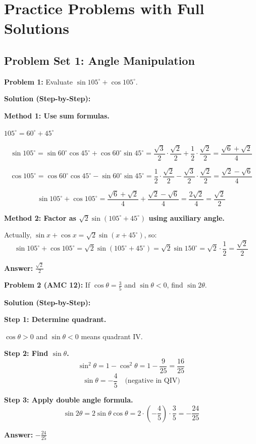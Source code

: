 \documentclass[12pt]{extarticle}
\begin{document}
\section{Practice Problems with Full Solutions}

\subsection{Problem Set 1: Angle Manipulation}

\begin{examplebox}
\textbf{Problem 1:} Evaluate $\sin 105^\circ + \cos 105^\circ$.

\textbf{Solution (Step-by-Step):}

\textbf{Method 1: Use sum formulas.}

$105^\circ = 60^\circ + 45^\circ$

\[
\sin 105^\circ = \sin 60^\circ \cos 45^\circ + \cos 60^\circ \sin 45^\circ = \frac{\sqrt{3}}{2} \cdot \frac{\sqrt{2}}{2} + \frac{1}{2} \cdot \frac{\sqrt{2}}{2} = \frac{\sqrt{6} + \sqrt{2}}{4}
\]

\[
\cos 105^\circ = \cos 60^\circ \cos 45^\circ - \sin 60^\circ \sin 45^\circ = \frac{1}{2} \cdot \frac{\sqrt{2}}{2} - \frac{\sqrt{3}}{2} \cdot \frac{\sqrt{2}}{2} = \frac{\sqrt{2} - \sqrt{6}}{4}
\]

\[
\sin 105^\circ + \cos 105^\circ = \frac{\sqrt{6} + \sqrt{2}}{4} + \frac{\sqrt{2} - \sqrt{6}}{4} = \frac{2\sqrt{2}}{4} = \frac{\sqrt{2}}{2}
\]

\textbf{Method 2: Factor as $\sqrt{2}\sin(105^\circ + 45^\circ)$ using auxiliary angle.}

Actually, $\sin x + \cos x = \sqrt{2}\sin(x + 45^\circ)$, so:
\[
\sin 105^\circ + \cos 105^\circ = \sqrt{2}\sin(105^\circ + 45^\circ) = \sqrt{2}\sin 150^\circ = \sqrt{2} \cdot \frac{1}{2} = \frac{\sqrt{2}}{2}
\]

\textbf{Answer:} $\boxed{\frac{\sqrt{2}}{2}}$
\end{examplebox}

\begin{examplebox}
\textbf{Problem 2 (AMC 12):} If $\cos\theta = \frac{3}{5}$ and $\sin\theta < 0$, find $\sin 2\theta$.

\textbf{Solution (Step-by-Step):}

\textbf{Step 1: Determine quadrant.}

$\cos\theta > 0$ and $\sin\theta < 0$ means quadrant IV.

\textbf{Step 2: Find $\sin\theta$.}
\[
\sin^2\theta = 1 - \cos^2\theta = 1 - \frac{9}{25} = \frac{16}{25}
\]
\[
\sin\theta = -\frac{4}{5} \quad \text{(negative in QIV)}
\]

\textbf{Step 3: Apply double angle formula.}
\[
\sin 2\theta = 2\sin\theta\cos\theta = 2 \cdot \left(-\frac{4}{5}\right) \cdot \frac{3}{5} = -\frac{24}{25}
\]

\textbf{Answer:} $\boxed{-\frac{24}{25}}$
\end{examplebox}
\end{document}
